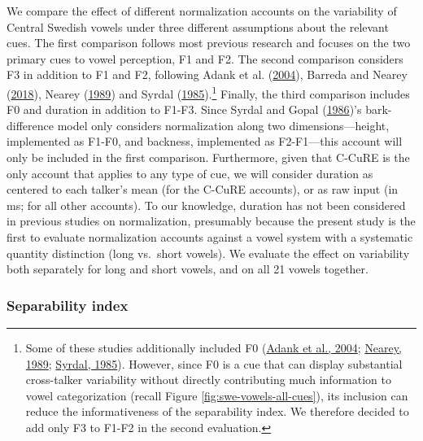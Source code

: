 \documentclass[utf8]{frontiersSCNS}
\begin{document}
We compare the effect of different normalization accounts on the variability of Central Swedish vowels under three different assumptions about the relevant cues. The first comparison follows most previous research and focuses on the two primary cues to vowel perception, F1 and F2. The second comparison considers F3 in addition to F1 and F2, following Adank et al. (\protect\hyperlink{ref-adank2004}{2004}), Barreda and Nearey (\protect\hyperlink{ref-barreda2018a}{2018}), Nearey (\protect\hyperlink{ref-nearey1989}{1989}) and Syrdal (\protect\hyperlink{ref-syrda1985}{1985}).\footnote{Some of these studies additionally included F0 (\protect\hyperlink{ref-adank2004}{Adank et al., 2004}; \protect\hyperlink{ref-nearey1989}{Nearey, 1989}; \protect\hyperlink{ref-syrda1985}{Syrdal, 1985}). However, since F0 is a cue that can display substantial cross-talker variability without directly contributing much information to vowel categorization (recall Figure \ref{fig:swe-vowels-all-cues}), its inclusion can reduce the informativeness of the separability index. We therefore decided to add only F3 to F1-F2 in the second evaluation.} Finally, the third comparison includes F0 and duration in addition to F1-F3. Since Syrdal and Gopal (\protect\hyperlink{ref-Syrdal1986}{1986})'s bark-difference model only considers normalization along two dimensions---height, implemented as F1-F0, and backness, implemented as F2-F1---this account will only be included in the first comparison. Furthermore, given that C-CuRE is the only account that applies to any type of cue, we will consider duration as centered to each talker's mean (for the C-CuRE accounts), or as raw input (in ms; for all other accounts). To our knowledge, duration has not been considered in previous studies on normalization, presumably because the present study is the first to evaluate normalization accounts against a vowel system with a systematic quantity distinction (long vs.~short vowels). We evaluate the effect on variability both separately for long and short vowels, and on all 21 vowels together.

\hypertarget{sec:separabilityIndex}{%
\subsubsection*{Separability index}\label{sec:separabilityIndex}}
\end{document}
